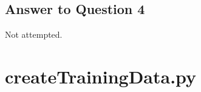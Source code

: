 \documentclass{article}
\begin{document}
\subsection*{Answer to Question 4}

Not attempted.






\newpage
\appendix

\section{createTrainingData.py}
\end{document}
